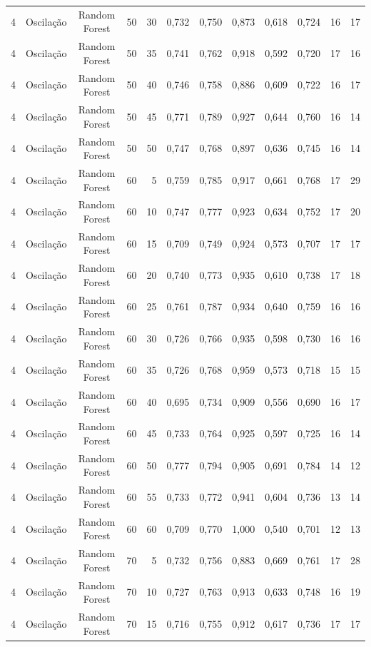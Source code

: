 \begin{longtable}{ccclrrrrrrrr}
4 & Oscilação & Random Forest & 50 & 30 & 0,732 & 0,750 & 0,873 & 0,618 & 0,724 & 16 & 17 \\
4 & Oscilação & Random Forest & 50 & 35 & 0,741 & 0,762 & 0,918 & 0,592 & 0,720 & 17 & 16 \\
4 & Oscilação & Random Forest & 50 & 40 & 0,746 & 0,758 & 0,886 & 0,609 & 0,722 & 16 & 17 \\
4 & Oscilação & Random Forest & 50 & 45 & 0,771 & 0,789 & 0,927 & 0,644 & 0,760 & 16 & 14 \\
4 & Oscilação & Random Forest & 50 & 50 & 0,747 & 0,768 & 0,897 & 0,636 & 0,745 & 16 & 14 \\
4 & Oscilação & Random Forest & 60 & 5 & 0,759 & 0,785 & 0,917 & 0,661 & 0,768 & 17 & 29 \\
4 & Oscilação & Random Forest & 60 & 10 & 0,747 & 0,777 & 0,923 & 0,634 & 0,752 & 17 & 20 \\
4 & Oscilação & Random Forest & 60 & 15 & 0,709 & 0,749 & 0,924 & 0,573 & 0,707 & 17 & 17 \\
4 & Oscilação & Random Forest & 60 & 20 & 0,740 & 0,773 & 0,935 & 0,610 & 0,738 & 17 & 18 \\
4 & Oscilação & Random Forest & 60 & 25 & 0,761 & 0,787 & 0,934 & 0,640 & 0,759 & 16 & 16 \\
4 & Oscilação & Random Forest & 60 & 30 & 0,726 & 0,766 & 0,935 & 0,598 & 0,730 & 16 & 16 \\
4 & Oscilação & Random Forest & 60 & 35 & 0,726 & 0,768 & 0,959 & 0,573 & 0,718 & 15 & 15 \\
4 & Oscilação & Random Forest & 60 & 40 & 0,695 & 0,734 & 0,909 & 0,556 & 0,690 & 16 & 17 \\
4 & Oscilação & Random Forest & 60 & 45 & 0,733 & 0,764 & 0,925 & 0,597 & 0,725 & 16 & 14 \\
4 & Oscilação & Random Forest & 60 & 50 & 0,777 & 0,794 & 0,905 & 0,691 & 0,784 & 14 & 12 \\
4 & Oscilação & Random Forest & 60 & 55 & 0,733 & 0,772 & 0,941 & 0,604 & 0,736 & 13 & 14 \\
4 & Oscilação & Random Forest & 60 & 60 & 0,709 & 0,770 & 1,000 & 0,540 & 0,701 & 12 & 13 \\
4 & Oscilação & Random Forest & 70 & 5 & 0,732 & 0,756 & 0,883 & 0,669 & 0,761 & 17 & 28 \\
4 & Oscilação & Random Forest & 70 & 10 & 0,727 & 0,763 & 0,913 & 0,633 & 0,748 & 16 & 19 \\
4 & Oscilação & Random Forest & 70 & 15 & 0,716 & 0,755 & 0,912 & 0,617 & 0,736 & 17 & 17 \\

\end{longtable}
